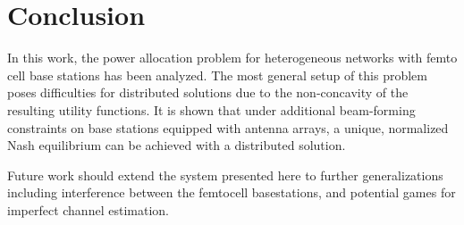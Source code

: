 \chapter{Conclusion}
In this work, the power allocation problem for heterogeneous networks with femto cell base stations has been analyzed. The most general setup of this problem poses difficulties for distributed solutions due to the non-concavity of the resulting utility functions. It is shown that under additional beam-forming constraints on base stations equipped with antenna arrays, a unique, normalized Nash equilibrium can be achieved with a distributed solution. 
\par
Future work should extend the system presented here to further generalizations including interference between the femtocell basestations, and potential games for imperfect channel estimation. 